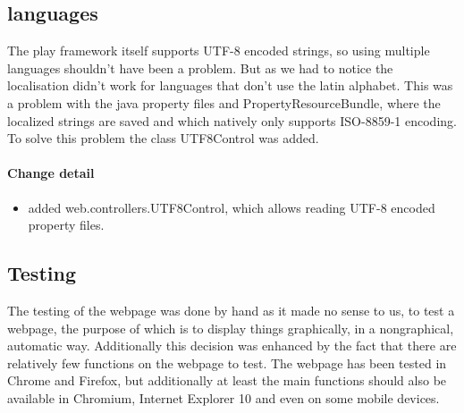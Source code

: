 \subsection{languages}
The play framework itself supports UTF-8 encoded strings, so using multiple languages shouldn't have been a problem. 
But as we had to notice the localisation didn't work for languages that don't use the latin alphabet.
This was a problem with the java property files and PropertyResourceBundle, where the localized strings are saved and which natively only
supports ISO-8859-1 encoding.
To solve this problem the class UTF8Control was added.

\paragraph{Change detail}
\begin{itemize}
  \item added web.controllers.UTF8Control, which allows reading UTF-8 encoded property files.
\end{itemize}

\subsection{Testing}
The testing of the webpage was done by hand as it made no sense to us, to test a webpage, 
the purpose of which is to display things graphically, in a nongraphical, automatic way.
Additionally this decision was enhanced by the fact that there are relatively few functions on the webpage to test.
The webpage has been tested in Chrome and Firefox, but additionally at least the main functions should also be available in Chromium,
Internet Explorer 10 and even on some mobile devices.
